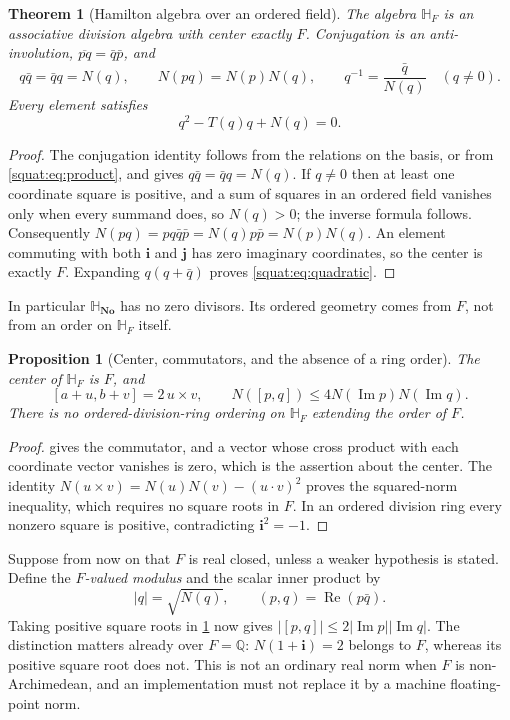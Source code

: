 \documentclass[11pt,letterpaper]{article}
\numberwithin{equation}{section}
\newtheorem{theorem}{Theorem}[section]
\newtheorem{proposition}[proposition]{Proposition}
\theoremstyle{definition}
\theoremstyle{remark}
\newcommand{\No}{\mathbf{No}}
\newcommand{\SQ}{\mathbb H_{\No}}
\newcommand{\HF}{\mathbb H_F}
\newcommand{\Q}{\mathbb Q}
\newcommand{\ii}{\mathbf i}
\newcommand{\jj}{\mathbf j}
\newcommand{\Rea}{\operatorname{Re}}
\newcommand{\Ima}{\operatorname{Im}}
\newcommand{\abs}[1]{\left|#1\right|}
\begin{document}
\begin{theorem}[Hamilton algebra over an ordered field]\label{squat:thm:division}
The algebra $\HF$ is an associative division algebra with center exactly $F$.
Conjugation is an anti-involution, $\overline{pq}=\bar q\bar p$, and
\begin{equation}\label{squat:eq:inverse}
 q\bar q=\bar qq=N(q),\qquad N(pq)=N(p)N(q),\qquad
 q^{-1}=\frac{\bar q}{N(q)}\quad(q\ne0).
\end{equation}
Every element satisfies
\begin{equation}\label{squat:eq:quadratic}
 q^2-T(q)q+N(q)=0 .
\end{equation}
\end{theorem}
\begin{proof}
The conjugation identity follows from the relations on the basis, or from
\cref{squat:eq:product}, and gives $q\bar q=\bar qq=N(q)$. If $q\ne0$ then at least one
coordinate square is positive, and a sum of squares in an ordered field vanishes only
when every summand does, so $N(q)>0$; the inverse formula follows. Consequently
$N(pq)=pq\bar q\bar p=N(q)p\bar p=N(p)N(q)$. An element commuting with both $\ii$ and
$\jj$ has zero imaginary coordinates, so the center is exactly $F$. Expanding
$q(q+\bar q)$ proves \cref{squat:eq:quadratic}.
\end{proof}

In particular $\SQ$ has no zero divisors. Its ordered geometry comes from $F$, not from
an order on $\HF$ itself.

\begin{proposition}[Center, commutators, and the absence of a ring order]\label{squat:prop:center}
The center of $\HF$ is $F$, and
\[
 [a+u,b+v]=2\,u\times v,\qquad
 N([p,q])\le4N(\Ima p)N(\Ima q).
\]
There is no ordered-division-ring ordering on $\HF$ extending the order of $F$.
\end{proposition}
\begin{proof}
 gives the commutator, and a vector whose cross product with each
coordinate vector vanishes is zero, which is the assertion about the center. The identity
$N(u\times v)=N(u)N(v)-(u\cdot v)^2$ proves the squared-norm inequality, which
requires no square roots in $F$. In an ordered
division ring every nonzero square is positive, contradicting $\ii^2=-1$.
\end{proof}

Suppose from now on that $F$ is real closed, unless a weaker hypothesis is stated.
Define the \emph{$F$-valued modulus} and the scalar inner product by
\[
 \abs q=\sqrt{N(q)},\qquad (p,q)=\Rea(p\bar q).
\]
Taking positive square roots in \cref{squat:prop:center} now gives
$\abs{[p,q]}\le2\abs{\Ima p}\abs{\Ima q}$. The distinction matters already
over $F=\Q$: $N(1+\ii)=2$ belongs to $F$, whereas its positive square root does not.
This is not an ordinary real norm when $F$ is non-Archimedean, and an implementation must
not replace it by a machine floating-point norm.
\end{document}
